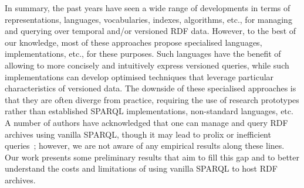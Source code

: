 \documentclass{llncs}
\begin{document}
In summary, the past years have seen a wide range of developments in terms of representations, languages, vocabularies, indexes, algorithms, etc., for managing and querying over temporal and/or versioned RDF data. However, to the best of our knowledge, most of these approaches propose specialised languages, implementations, etc., for these purposes. Such languages have the benefit of allowing to more concisely and intuitively express versioned queries, while such implementations can develop optimised techniques that leverage particular characteristics of versioned data. The downside of these specialised approaches is that they are often diverge from practice, requiring the use of research prototypes rather than established SPARQL implementations, non-standard languages, etc. A number of authors have acknowledged that one can manage and query RDF archives using vanilla SPARQL, though it may lead to prolix or inefficient queries~\cite{TappoletB09,FernandezUPK19}; however, we are not aware of any empirical results along these lines. Our work presents some preliminary results that aim to fill this gap and to better understand the costs and limitations of using vanilla SPARQL to host RDF archives.








\end{document}
